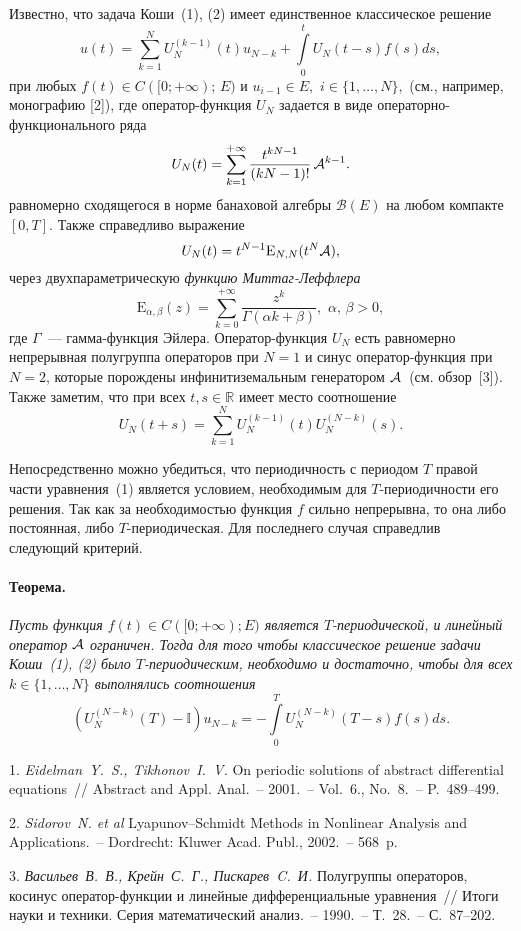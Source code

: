 Известно, что задача Коши~(1), (2) имеет единственное классическое решение 
$$
u(t)=\sum\limits_{k=1}^{N}U_{N}^{(k-1)}(t)u_{N-k}+\int\limits_{0}^{t}U_{N}(t-s)f(s)ds,
$$
при любых $f(t)\in C([0;+\infty);\,E)$ и $u_{i-1}\in E,\,\,i\in\lbrace 1,\ldots,N\rbrace,$ (см., например, монографию [2]), где оператор-функция $U_{N}$ задается в виде операторно-функционального ряда
$$
U_{N}(t)=\sum\limits_{k=1}^{+\infty}\frac{t^{kN-1}}{(kN-1)!}\,{\cal A}^{k-1}.
$$
равномерно сходящегося в норме банаховой алгебры ${\mathscr B}(E)$ на любом компакте $[0,T]$. Также справедливо выражение
$$
U_{N}(t)=t^{N-1}{\mathrm E}_{N,N}(t^{N}{\cal A}),
$$
через двухпараметрическую {\it функцию Миттаг-Леффлера} 
$$
{\mathrm E}_{\alpha,\beta}(z)=\sum\limits_{k=0}^{+\infty}\frac{z^{k}}{\Gamma(\alpha k+\beta)},\,\,\alpha,\,\beta>0,
$$
где $\Gamma$~--- гамма-функция Эйлера. Оператор-функция $U_{N}$ есть равномерно непрерывная полугруппа операторов при $N=1$ и синус оператор-функция при $N=2$, которые порождены инфинитиземальным генератором ${\cal A}$~(см. обзор~[3]). Также заметим, что при всех $t,s\in{\mathbb R}$ имеет место  соотношение
$$
U_{N}(t+s)=\sum\limits_{k=1}^{N}U_{N}^{(k-1)}(t)U_{N}^{(N-k)}(s).
$$

Непосредственно можно убедиться, что периодичность с периодом $T$ правой части  уравнения~(1) является условием, необходимым для $T$-периодичности его решения. Так как за необходимостью функция $f$ сильно непрерывна, то она либо постоянная, либо $T$-периодическая. Для последнего случая справедлив следующий критерий.

\paragraph{Теорема.} {\it Пусть функция $f(t)\in C([0;+\infty);E)$ является $T$-периодической, и линейный оператор ${\cal A}$ ограничен. Тогда для того чтобы классическое решение задачи Коши~(1), (2) было $T$-периодическим,  необходимо и достаточно, чтобы для всех $k\in\lbrace 1,\ldots,N\rbrace$ выполнялись соотношения
$$
(U_{N}^{(N-k)}(T)-{\mathbb I})u_{N-k}=-\int\limits_{0}^{T}U_{N}^{(N-k)}(T-s)f(s)ds.
$$}

\litlist

1. {\it Eidelman~Y.~S., Tikhonov~I.~V.} On periodic solutions of abstract differential equations~// Abstract and Appl. Anal.~– 2001.~– Vol.~6., No.~8.~– P.~489–499.

2. {\it Sidorov~N. et al} Lyapunov–Schmidt Methods in Nonlinear Analysis and Applications.~– Dordrecht: Kluwer Acad. Publ., 2002.~– 568~p.

3. {\it Васильев~В.~В., Крейн~С.~Г., Пискарев~C.~И.} Полугруппы операторов, косинус оператор-функции и линейные дифференциальные уравнения~// Итоги науки и техники. Серия математический анализ.~– 1990.~– Т.~28.~– С.~87–202.
